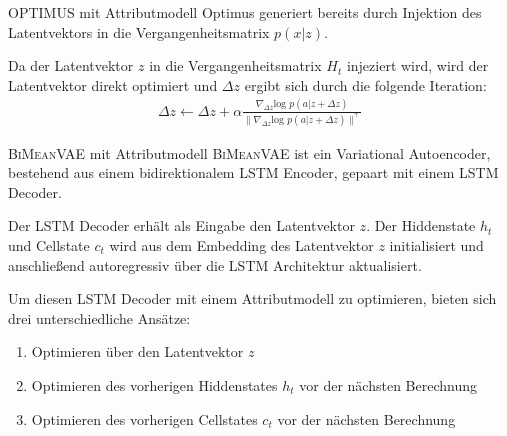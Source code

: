 \begin{frame}{OPTIMUS mit Attributmodell}
  Optimus generiert bereits durch Injektion des Latentvektors in die Vergangenheitsmatrix $p(x|z)$.

  Da der Latentvektor $z$ in die Vergangenheitsmatrix $H_t$ injeziert wird, wird der Latentvektor direkt optimiert und $\Delta z$ ergibt sich durch die folgende Iteration:
\begin{align*}
    \Delta z \leftarrow \Delta z + \alpha \frac{\nabla_{\Delta z} \text{log }p(a|z+\Delta z)}{\| \nabla_{\Delta z} \text{log }p(a|z+\Delta z)\|^\gamma}
\end{align*}
  
\end{frame}

\begin{frame}{\textsc{BiMeanVAE} mit Attributmodell}
  \textsc{BiMeanVAE} ist ein Variational Autoencoder, bestehend aus einem bidirektionalem LSTM Encoder, gepaart mit einem LSTM Decoder.

Der LSTM Decoder erhält als Eingabe den Latentvektor $z$. Der Hiddenstate $h_t$ und Cellstate $c_t$ wird aus dem Embedding des Latentvektor $z$ initialisiert und anschließend autoregressiv über die LSTM Architektur aktualisiert.

Um diesen LSTM Decoder mit einem Attributmodell zu optimieren, bieten sich drei unterschiedliche Ansätze:

\begin{enumerate}
    \item Optimieren über den Latentvektor $z$
    \item Optimieren des vorherigen Hiddenstates $h_t$ vor der nächsten Berechnung
    \item Optimieren des vorherigen Cellstates $c_t$ vor der nächsten Berechnung
\end{enumerate}
  
\end{frame}


